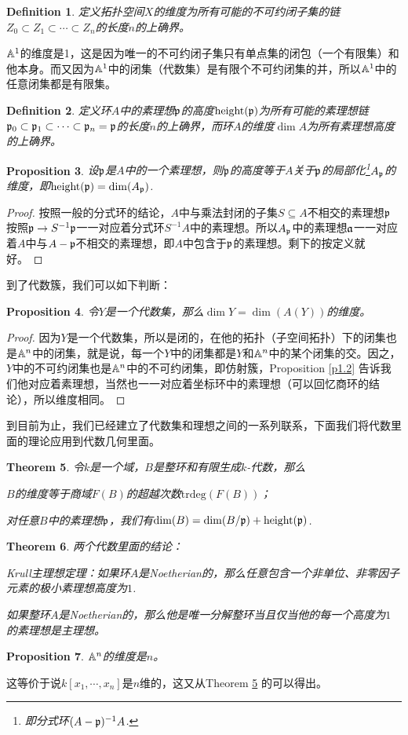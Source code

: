 \documentclass[9pt]{extbook}
\theoremstyle{plain}%
\newtheorem{defi}{Definition}[section]%
\newtheorem{pro}[defi]{Proposition}%
\newtheorem{theo}[defi]{Theorem}%
\begin{document}
\begin{defi}
	定义拓扑空间$X$的维度为所有可能的不可约闭子集的链$Z_0\subset Z_1\subset \cdots \subset Z_n$的长度$n$的上确界。
\end{defi}

$\mathbb{A}^1$的维度是1，这是因为唯一的不可约闭子集只有单点集的闭包（一个有限集）和他本身。而又因为$\mathbb{A}^1$中的闭集（代数集）是有限个不可约闭集的并，所以$\mathbb{A}^1$中的任意闭集都是有限集。

\begin{defi}
定义环$A$中的素理想$\mathfrak{p}$的高度$\operatorname{height}(\mathfrak{p})$为所有可能的素理想链$\mathfrak{p}_0\subset \mathfrak{p}_1\subset \cdots \subset \mathfrak{p}_n=\mathfrak{p}$的长度$n$的上确界，而环$A$的维度$\dim A$为所有素理想高度的上确界。
\end{defi}
\begin{pro}
设$\mathfrak{p}$是$A$中的一个素理想，则$\mathfrak{p}$的高度等于$A$关于$\mathfrak{p}$的局部化\footnote{即分式环$(A-\mathfrak{p})^{-1}A$.}$A_{\mathfrak{p}}$的维度，即$\operatorname{height}(\mathfrak{p})=\dim (A_{\mathfrak{p}})$.
\end{pro}
\begin{proof}
按照一般的分式环的结论，$A$中与乘法封闭的子集$S\subseteq A$不相交的素理想$\mathfrak{p}$按照$\mathfrak{p} \to S^{-1}\mathfrak{p}$一一对应着分式环$S^{-1}A$中的素理想。所以$A_{\mathfrak{p}}$中的素理想$\mathfrak{a}$一一对应着$A$中与$A-\mathfrak{p}$不相交的素理想，即$A$中包含于$\mathfrak{p}$的素理想。剩下的按定义就好。
\end{proof}

到了代数簇，我们可以如下判断：

\begin{pro}令$Y$是一个代数集，那么$\dim Y=\dim (A(Y))$的维度。\end{pro}

\begin{proof}
因为$Y$是一个代数集，所以是闭的，在他的拓扑（子空间拓扑）下的闭集也是$\mathbb{A}^n$中的闭集，就是说，每一个$Y$中的闭集都是$Y$和$\mathbb{A}^n$中的某个闭集的交。因之，$Y$中的不可约闭集也是$\mathbb{A}^n$中的不可约闭集，即仿射簇，Proposition \ref{p1.2} 告诉我们他对应着素理想，当然也一一对应着坐标环中的素理想（可以回忆商环的结论），所以维度相同。
\end{proof}
到目前为止，我们已经建立了代数集和理想之间的一系列联系，下面我们将代数里面的理论应用到代数几何里面。

\begin{theo}
令$k$是一个域，$B$是整环和有限生成$k$-代数，那么

 $B$的维度等于商域$F(B)$的超越次数$\mathrm{trdeg}(F(B))$；

 对任意$B$中的素理想$\mathfrak{p}$，我们有$\dim (B)=\dim (B/\mathfrak{p}) +\operatorname{height}(\mathfrak{p}) $.
\label{t1.2}
\end{theo}
\begin{theo}两个代数里面的结论：

Krull主理想定理：如果环$A$是Noetherian的，那么任意包含一个非单位、非零因子元素的极小素理想高度为$1$.

如果整环$A$是Noetherian的，那么他是唯一分解整环当且仅当他的每一个高度为$1$的素理想是主理想。
\end{theo}
\begin{pro}
$\mathbb{A}^n$的维度是$n$。
\end{pro}
这等价于说$k[x_1,\cdots, x_n]$是$n$维的，这又从Theorem \ref{t1.2} 的可以得出。
\end{document}
